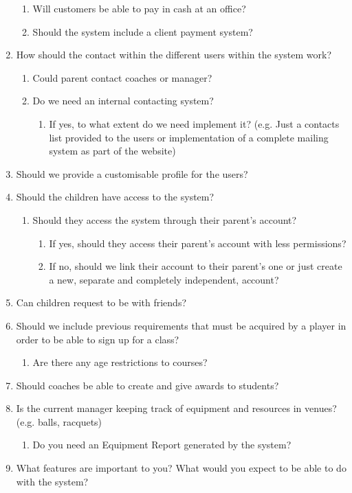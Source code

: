 \documentclass{l3proj}
\begin{document}
\begin{enumerate}
\begin{enumerate}
		\item Will customers be able to pay in cash at an office?
		\item Should the system include a client payment system?
		\end{enumerate}
\item How should the contact within the different users within the system work?
		\begin{enumerate}
		\item Could parent contact coaches or manager?
		\item Do we need an internal contacting system?
			\begin{enumerate}
			\item If yes, to what extent do we need implement it? (e.g. Just a contacts list provided to the users or implementation of a complete mailing system as part of the website)
			\end{enumerate}
		\end{enumerate}
\item Should we provide a customisable profile for the users?
\item Should the children have access to the system?
		\begin{enumerate}
		\item Should they access the system through their parent's account?
			\begin{enumerate}
			\item If yes, should they access their parent's account with less permissions?
			\item If no, should we link their account to their parent's one or just create a new, separate and completely independent, account?
			\end{enumerate}
		\end{enumerate}
\item Can children request to be with friends?
\item Should we include previous requirements that must be acquired by a player in order to be able to sign up for a class?
	\begin{enumerate}
	\item Are there any age restrictions to courses?
	\end{enumerate}
\item Should coaches be able to create and give awards to students?
\item Is the current manager keeping track of equipment and resources in venues? (e.g. balls, racquets)
	\begin{enumerate}
	\item Do you need an Equipment Report generated by the system?
	\end{enumerate}
\item What features are important to you? What would you expect to be able to do with the system?
\end{enumerate}
\end{document}
